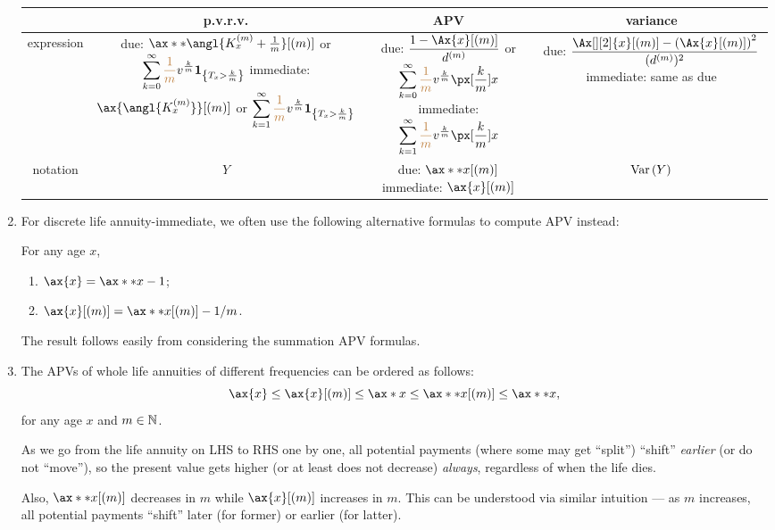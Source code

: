 \begin{enumerate}
\begin{tabular}{cccc}
\toprule
&p.v.r.v.&APV&variance\\
\midrule
expression&
\makecell{
due: \(\ax**{\angl{K_x^{(m)}+\frac{1}{m}}}[(m)]\) or \\
\(\displaystyle\sum_{k=0}^{\infty}{\color{brown}\frac{1}{m}}v^{\frac{k}{m}}\mathbf{1}_{\left\{T_x>\frac{k}{m}\right\}}\)\\
immediate: \(\ax{\angl{K_x^{(m)}}}[(m)]\) or \\
\(\displaystyle\sum_{k=1}^{\infty}{\color{brown}\frac{1}{m}}v^{\frac{k}{m}}\mathbf{1}_{\left\{T_x>\frac{k}{m}\right\}}\)
}
&\makecell{
due: \(\displaystyle \frac{1-\Ax{x}[(m)]}{d^{(m)}}\) 
or \(\displaystyle\sum_{k=0}^{\infty}{\color{brown}\frac{1}{m}}v^{\frac{k}{m}}\px[ \frac{k}{m}]{x}\)\\
immediate: \(\displaystyle\sum_{k=1}^{\infty}{\color{brown}\frac{1}{m}}v^{\frac{k}{m}}\px[ \frac{k}{m}]{x}\)
}
&\makecell{due: \(\displaystyle \frac{\Ax[][2]{x}[(m)]-\qty(\Ax{x}[(m)])^2}{(d^{(m)})^{2}}\)\\
immediate: same as due
}\\
notation&\(Y\)&
\makecell{due: \(\ax**{x}[(m)]\)\\
immediate: \(\ax{x}[(m)]\)}&\(\operatorname{Var}\qty(Y)\)\\
\bottomrule
\end{tabular}
\item For discrete life annuity-immediate, we often use the following alternative
formulas to compute APV instead:
\begin{proposition}
\label{prp:wl-due-immediate-fmlas}
For any age \(x\),
\begin{enumerate}
\item \(\ax{x}=\ax**{x}-1\);
\item \(\ax{x}[(m)]=\ax**{x}[(m)]-1/m\).
\end{enumerate}
\end{proposition}
\begin{pf}
The result follows easily from considering the summation APV formulas.
\end{pf}
\item The APVs of whole life annuities of different frequencies can be ordered
as follows:
\[
\ax{x}\le\ax{x}[(m)]\le\ax*{x}\le\ax**{x}[(m)]\le\ax**{x},
\]
for any age \(x\) and \(m\in\mathbb{N}\).

\begin{intuition}
As we go from the life annuity on LHS to RHS one by one, all potential payments
(where some may get ``split'') ``shift'' \emph{earlier} (or do not ``move''),
so the present value gets higher (or at least does not decrease) \emph{always},
regardless of when the life dies.
\end{intuition}

Also, \(\ax**{x}[(m)]\) decreases in \(m\) while \(\ax{x}[(m)]\) increases in
\(m\). This can be understood via similar intuition --- as \(m\) increases, all
potential payments ``shift'' later (for former) or earlier (for latter).
\end{enumerate}
